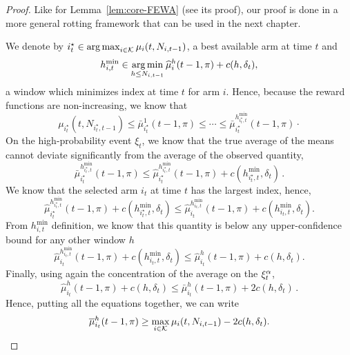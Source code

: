 \begin{proof}
Like for Lemma~\ref{lem:core-FEWA} (see its proof), our proof is done in a more general rotting framework that can be used in the next chapter. 

We denote by $
i^\star_t \in \operatorname*{arg\,max}_{i\in \mathcal{K}}{\mu_i(t,N_{i,t-1})}
$, a best available arm at time $t$ and 
\[
h_{i,t}^{\min} \in \operatorname*{arg\,min}_{h\leq N_{i,t-1}}{\widehat{\mu}_i^h(t-1,\pi) + c(h,\delta_t)},
\]
a window which minimizes \EUCB index at time $t$ for arm $i$. Hence, because the reward functions are non-increasing, we know that 
\begin{equation*}
 \mu_{i^\star_t}(t, N_{i^\star_t,t-1}) \leq   \bar{\mu}_{i^\star_t}^1(t-1,\pi) \leq \cdots \leq  \bar{\mu}_{i^\star_t}^{h_{i^\star_t,t}^{\min}}(t-1,\pi)\cdot
\end{equation*}
On the high-probability event $\xi_t$, we know that the true average of the means cannot deviate significantly from the average of the observed quantity,
\begin{equation*}
\bar{\mu}_{i^\star_t}^{h_{i^\star_t,t}^{\min}}(t-1, \pi) \leq \hat{\mu}_{i^\star_t}^{h_{i^\star_t,t}^{\min}}(t-1,\pi) + c(h_{i^\star_t,t}^{\min},\delta_t)\,.
\end{equation*}
We know that the selected arm $i_t$ at time $t$ has the largest index, hence, 
\[
\hat{\mu}_{i^\star_t}^{h^{\min}_{i^\star_t,t}}(t-1, \pi) + c(h^{\min}_{i^\star_t,t},\delta_t) \leq \hat{\mu}_{i_t}^{h^{\min}_{i_t,t}}(t-1, \pi) + c(h^{\min}_{i_t,t},\delta_t).
\]
From $h_{i,t}^{\min}$ definition, we know that this quantity is below any upper-confidence bound for any other window $h$
\[
\hat{\mu}_{i_t}^{h^{\min}_{i_t,t}}(t-1, \pi) + c(h^{\min}_{i_t,t},\delta_t) \leq \hat{\mu}_{i_t}^{h}(t-1, \pi) + c(h,\delta_t).
\]
Finally, using again the concentration of the average on the $\xi^\alpha_t$, 
\[
\hat{\mu}_{i_t}^{h}(t-1, \pi) + c(h,\delta_t) \leq \bar{\mu}_{i_t}^{h}(t-1, \pi) + 2c(h,\delta_t)\,.
\]
Hence, putting all the equations together, we can write
\begin{equation*}
\overline{\mu}_{i_t}^{h}(t-1, \pi) \geq \max_{i \in \mathcal{K}} \mu_{i}(t,N_{i,t-1}) - 2 c(h, \delta_t).
\end{equation*}
\end{proof}

